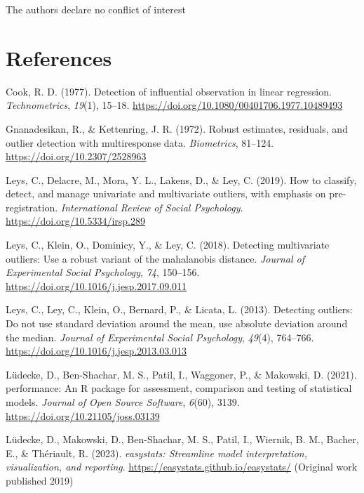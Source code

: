 \documentclass{article}
\newlength{\cslhangindent}
\newlength{\cslentryspacingunit} %
\newenvironment{CSLReferences}[2] %
 {%
  \setlength{\parindent}{0pt}
  \ifodd #1
  \let\oldpar\par
  \def\par{\hangindent=\cslhangindent\oldpar}
  \fi
  \setlength{\parskip}{#2\cslentryspacingunit}
 }%
 {}
\begin{document}
The authors declare no conflict of interest

\hypertarget{references}{%
\section*{References}\label{references}}

\hypertarget{refs}{}
\begin{CSLReferences}{1}{0}
\leavevmode{}%
Cook, R. D. (1977). Detection of influential observation in linear
regression. \emph{Technometrics}, \emph{19}(1), 15--18.
\url{https://doi.org/10.1080/00401706.1977.10489493}

\leavevmode{}%
Gnanadesikan, R., \& Kettenring, J. R. (1972). Robust estimates,
residuals, and outlier detection with multiresponse data.
\emph{Biometrics}, 81--124. \url{https://doi.org/10.2307/2528963}

\leavevmode{}%
Leys, C., Delacre, M., Mora, Y. L., Lakens, D., \& Ley, C. (2019). How
to classify, detect, and manage univariate and multivariate outliers,
with emphasis on pre-registration. \emph{International Review of Social
Psychology}. \url{https://doi.org/10.5334/irsp.289}

\leavevmode{}%
Leys, C., Klein, O., Dominicy, Y., \& Ley, C. (2018). Detecting
multivariate outliers: Use a robust variant of the mahalanobis distance.
\emph{Journal of Experimental Social Psychology}, \emph{74}, 150--156.
\url{https://doi.org/10.1016/j.jesp.2017.09.011}

\leavevmode{}%
Leys, C., Ley, C., Klein, O., Bernard, P., \& Licata, L. (2013).
Detecting outliers: Do not use standard deviation around the mean, use
absolute deviation around the median. \emph{Journal of Experimental
Social Psychology}, \emph{49}(4), 764--766.
\url{https://doi.org/10.1016/j.jesp.2013.03.013}

\leavevmode{}%
Lüdecke, D., Ben-Shachar, M. S., Patil, I., Waggoner, P., \& Makowski,
D. (2021). {performance}: An {R} package for assessment, comparison and
testing of statistical models. \emph{Journal of Open Source Software},
\emph{6}(60), 3139. \url{https://doi.org/10.21105/joss.03139}

\leavevmode{}%
Lüdecke, D., Makowski, D., Ben-Shachar, M. S., Patil, I., Wiernik, B.
M., Bacher, E., \& Thériault, R. (2023). \emph{{easystats}: Streamline
model interpretation, visualization, and reporting}.
\url{https://easystats.github.io/easystats/} (Original work published
2019)


\end{CSLReferences}
\end{document}
